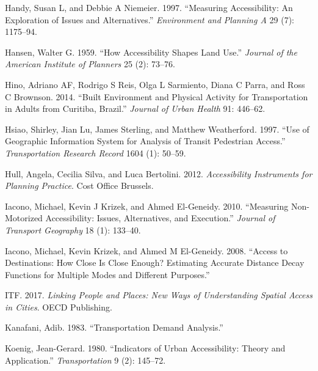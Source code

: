 \documentclass[preprint, 3p,
authoryear]{elsarticle} %
\newlength{\cslhangindent}
\newlength{\cslentryspacingunit} %
\newenvironment{CSLReferences}[2] %
 {%
  \setlength{\parindent}{0pt}
  \ifodd #1
  \let\oldpar\par
  \def\par{\hangindent=\cslhangindent\oldpar}
  \fi
  \setlength{\parskip}{#2\cslentryspacingunit}
 }%
 {}
\begin{document}
\begin{CSLReferences}{1}{0}
\leavevmode{}%
Handy, Susan L, and Debbie A Niemeier. 1997. {``Measuring Accessibility:
An Exploration of Issues and Alternatives.''} \emph{Environment and
Planning A} 29 (7): 1175--94.

\leavevmode{}%
Hansen, Walter G. 1959. {``How Accessibility Shapes Land Use.''}
\emph{Journal of the American Institute of Planners} 25 (2): 73--76.

\leavevmode{}%
Hino, Adriano AF, Rodrigo S Reis, Olga L Sarmiento, Diana C Parra, and
Ross C Brownson. 2014. {``Built Environment and Physical Activity for
Transportation in Adults from Curitiba, Brazil.''} \emph{Journal of
Urban Health} 91: 446--62.

\leavevmode{}%
Hsiao, Shirley, Jian Lu, James Sterling, and Matthew Weatherford. 1997.
{``Use of Geographic Information System for Analysis of Transit
Pedestrian Access.''} \emph{Transportation Research Record} 1604 (1):
50--59.

\leavevmode{}%
Hull, Angela, Cecilia Silva, and Luca Bertolini. 2012.
\emph{Accessibility Instruments for Planning Practice}. Cost Office
Brussels.

\leavevmode{}%
Iacono, Michael, Kevin J Krizek, and Ahmed El-Geneidy. 2010.
{``Measuring Non-Motorized Accessibility: Issues, Alternatives, and
Execution.''} \emph{Journal of Transport Geography} 18 (1): 133--40.

\leavevmode{}%
Iacono, Michael, Kevin Krizek, and Ahmed M El-Geneidy. 2008. {``Access
to Destinations: How Close Is Close Enough? Estimating Accurate Distance
Decay Functions for Multiple Modes and Different Purposes.''}

\leavevmode{}%
ITF. 2017. \emph{Linking People and Places: New Ways of Understanding
Spatial Access in Cities}. OECD Publishing.

\leavevmode{}%
Kanafani, Adib. 1983. {``Transportation Demand Analysis.''}

\leavevmode{}%
Koenig, Jean-Gerard. 1980. {``Indicators of Urban Accessibility: Theory
and Application.''} \emph{Transportation} 9 (2): 145--72.


\end{CSLReferences}
\end{document}
